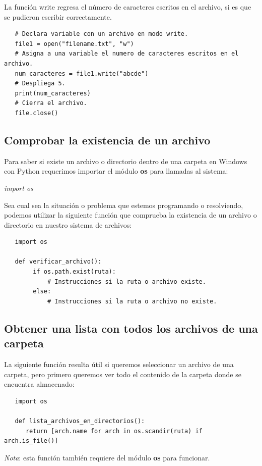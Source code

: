 La función write regresa el número de caracteres escritos en el archivo, si es que se pudieron escribir correctamente.
\begin{lstlisting}
   # Declara variable con un archivo en modo write.
   file1 = open("filename.txt", "w")
   # Asigna a una variable el numero de caracteres escritos en el archivo.
   num_caracteres = file1.write("abcde")
   # Despliega 5.
   print(num_caracteres)
   # Cierra el archivo.
   file.close()
\end{lstlisting}


\subsection{Comprobar la existencia de un archivo}
\hspace{0.55cm}Para saber si existe un archivo o directorio dentro de una carpeta en Windows con Python requerimos importar el módulo \textbf{os} para llamadas al sistema:
\begin{center}
	\textit{import os}
\end{center}

Sea cual sea la situación o problema que estemos programando o resolviendo, podemos utilizar la siguiente función que comprueba la existencia de un archivo o directorio en nuestro sistema de archivos:
\begin{lstlisting}
   import os
   
   def verificar_archivo():
		if os.path.exist(ruta):
   			# Instrucciones si la ruta o archivo existe.
   		else:
   			# Instrucciones si la ruta o archivo no existe.
\end{lstlisting}


\subsection{Obtener una lista con todos los archivos de una carpeta}
\hspace{0.55cm}La siguiente función resulta útil si queremos seleccionar un archivo de una carpeta, pero primero queremos ver todo el contenido de la carpeta donde se encuentra almacenado:
\begin{lstlisting}
   import os
   
   def lista_archivos_en_directorios():
      return [arch.name for arch in os.scandir(ruta) if arch.is_file()]
\end{lstlisting}

\textit{Nota}: esta función también requiere del módulo \textbf{os} para funcionar.


